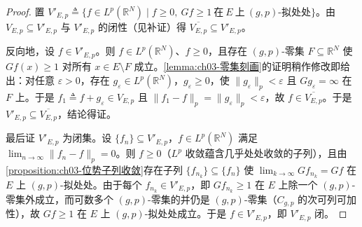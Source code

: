 \documentclass[../../main.tex]{subfiles}%
\begin{document}
\begin{proof}
置 $V'_{E,p}\triangleq\{f\in L^p(\mathbb{R}^N)\mid f\geqslant0,\ Gf\geqslant1\ \text{在}\ E\ \text{上}\ (g,p)\text{-拟处处}\}$。由 $V_{E,p}\subseteq V'_{E,p}$ 与 $V'_{E,p}$ 的闭性（见补证）得 $\overline{V_{E,p}}\subseteq V'_{E,p}$。

反向地，设 $f\in V'_{E,p}$。则 $f\in L^p(\mathbb{R}^N)$、$f\geqslant0$，且存在 $(g,p)$-零集 $F\subseteq\mathbb{R}^N$ 使 $Gf(x)\geqslant1$ 对所有 $x\in E\setminus F$ 成立。\cref{lemma:ch03-零集刻画}的证明稍作修改即给出：对任意 $\varepsilon>0$，存在 $g_\varepsilon\in L^p(\mathbb{R}^N)$，$g_\varepsilon\geqslant0$，使 $\|g_\varepsilon\|_p<\varepsilon$ 且 $Gg_\varepsilon=\infty$ 在 $F$ 上。于是 $f_1\triangleq f+g_\varepsilon\in V_{E,p}$ 且 $\|f_1-f\|_p=\|g_\varepsilon\|_p<\varepsilon$，故 $f\in\overline{V_{E,p}}$。于是 $V'_{E,p}\subseteq\overline{V_{E,p}}$，结论得证。

最后证 $V'_{E,p}$ 为闭集。设 $\{f_n\}\subseteq V'_{E,p}$，$f\in L^p(\mathbb{R}^N)$ 满足 $\lim_{n\to\infty}\|f_n-f\|_p=0$。则 $f\geqslant0$（$L^p$ 收敛蕴含几乎处处收敛的子列），且由\cref{proposition:ch03-位势子列收敛}存在子列 $\{f_{n_k}\}\subseteq\{f_n\}$ 使 $\lim_{k\to\infty}Gf_{n_k}=Gf$ 在 $E$ 上 $(g,p)$-拟处处。由于每个 $f_{n_k}\in V'_{E,p}$，即 $Gf_{n_k}\geqslant1$ 在 $E$ 上除一个 $(g,p)$-零集外成立，而可数多个 $(g,p)$-零集的并仍是 $(g,p)$-零集（$C_{g,p}$ 的次可列可加性），故 $Gf\geqslant1$ 在 $E$ 上 $(g,p)$-拟处处成立。于是 $f\in V'_{E,p}$，即 $V'_{E,p}$ 闭。
\end{proof}
\end{document}
